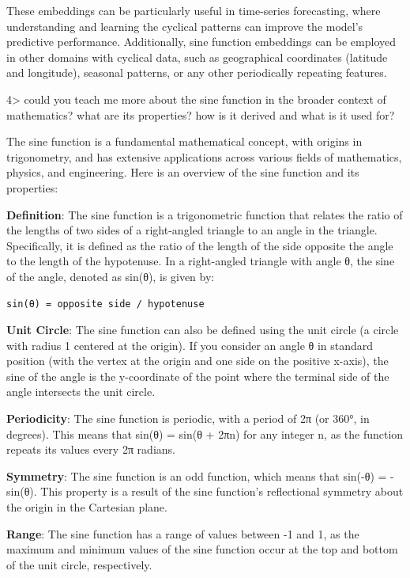\documentclass[
]{article}
\begin{document}
These embeddings can be particularly useful in time-series forecasting,
where understanding and learning the cyclical patterns can improve the
model's predictive performance. Additionally, sine function embeddings
can be employed in other domains with cyclical data, such as
geographical coordinates (latitude and longitude), seasonal patterns, or
any other periodically repeating features.

4\textgreater{} could you teach me more about the sine function in the
broader context of mathematics? what are its properties? how is it
derived and what is it used for?

The sine function is a fundamental mathematical concept, with origins in
trigonometry, and has extensive applications across various fields of
mathematics, physics, and engineering. Here is an overview of the sine
function and its properties:

\textbf{Definition}: The sine function is a trigonometric function that
relates the ratio of the lengths of two sides of a right-angled triangle
to an angle in the triangle. Specifically, it is defined as the ratio of
the length of the side opposite the angle to the length of the
hypotenuse. In a right-angled triangle with angle θ, the sine of the
angle, denoted as sin(θ), is given by:

\begin{verbatim}
sin(θ) = opposite side / hypotenuse
\end{verbatim}

\textbf{Unit Circle}: The sine function can also be defined using the
unit circle (a circle with radius 1 centered at the origin). If you
consider an angle θ in standard position (with the vertex at the origin
and one side on the positive x-axis), the sine of the angle is the
y-coordinate of the point where the terminal side of the angle
intersects the unit circle.

\textbf{Periodicity}: The sine function is periodic, with a period of 2π
(or 360°, in degrees). This means that sin(θ) = sin(θ + 2πn) for any
integer n, as the function repeats its values every 2π radians.

\textbf{Symmetry}: The sine function is an odd function, which means
that sin(-θ) = -sin(θ). This property is a result of the sine function's
reflectional symmetry about the origin in the Cartesian plane.

\textbf{Range}: The sine function has a range of values between -1 and
1, as the maximum and minimum values of the sine function occur at the
top and bottom of the unit circle, respectively.
\end{document}
